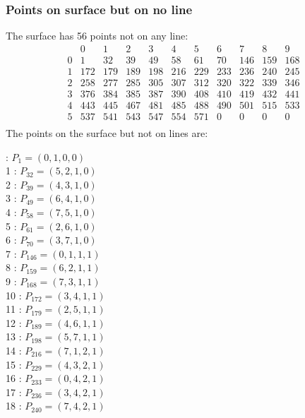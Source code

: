 \documentclass{article}
\begin{document}
{\subsubsection*{Points on surface but on no line}
The surface has 56 points not on any line:\\
$$
\begin{array}{r|*{10}{r}}
 & 0 & 1 & 2 & 3 & 4 & 5 & 6 & 7 & 8 & 9\\
\hline
0 & 1 & 32 & 39 & 49 & 58 & 61 & 70 & 146 & 159 & 168\\
1 & 172 & 179 & 189 & 198 & 216 & 229 & 233 & 236 & 240 & 245\\
2 & 258 & 277 & 285 & 305 & 307 & 312 & 320 & 322 & 339 & 346\\
3 & 376 & 384 & 385 & 387 & 390 & 408 & 410 & 419 & 432 & 441\\
4 & 443 & 445 & 467 & 481 & 485 & 488 & 490 & 501 & 515 & 533\\
5 & 537 & 541 & 543 & 547 & 554 & 571 & 0 & 0 & 0 & 0\\
\end{array}
$$
The points on the surface but not on lines are:\\
\begin{multicols}{2}
 : $P_{1}=( 0, 1, 0, 0 )$\\
1 : $P_{32}=( 5, 2, 1, 0 )$\\
2 : $P_{39}=( 4, 3, 1, 0 )$\\
3 : $P_{49}=( 6, 4, 1, 0 )$\\
4 : $P_{58}=( 7, 5, 1, 0 )$\\
5 : $P_{61}=( 2, 6, 1, 0 )$\\
6 : $P_{70}=( 3, 7, 1, 0 )$\\
7 : $P_{146}=( 0, 1, 1, 1 )$\\
8 : $P_{159}=( 6, 2, 1, 1 )$\\
9 : $P_{168}=( 7, 3, 1, 1 )$\\
10 : $P_{172}=( 3, 4, 1, 1 )$\\
11 : $P_{179}=( 2, 5, 1, 1 )$\\
12 : $P_{189}=( 4, 6, 1, 1 )$\\
13 : $P_{198}=( 5, 7, 1, 1 )$\\
14 : $P_{216}=( 7, 1, 2, 1 )$\\
15 : $P_{229}=( 4, 3, 2, 1 )$\\
16 : $P_{233}=( 0, 4, 2, 1 )$\\
17 : $P_{236}=( 3, 4, 2, 1 )$\\
18 : $P_{240}=( 7, 4, 2, 1 )$\\

\end{multicols}}
\end{document}

